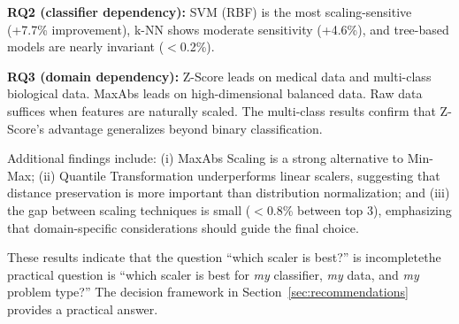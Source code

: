 \documentclass[12pt,a4paper]{article}
\begin{document}
\textbf{RQ2 (classifier dependency):} SVM (RBF) is the most scaling-sensitive (+7.7\% improvement), k-NN shows moderate sensitivity (+4.6\%), and tree-based models are nearly invariant ($<$0.2\%).

\textbf{RQ3 (domain dependency):} Z-Score leads on medical data and multi-class biological data. MaxAbs leads on high-dimensional balanced data. Raw data suffices when features are naturally scaled. The multi-class results confirm that Z-Score's advantage generalizes beyond binary classification.

Additional findings include: (i) MaxAbs Scaling is a strong alternative to Min-Max; (ii) Quantile Transformation underperforms linear scalers, suggesting that distance preservation is more important than distribution normalization; and (iii) the gap between scaling techniques is small ($<$0.8\% between top 3), emphasizing that domain-specific considerations should guide the final choice.

These results indicate that the question ``which scaler is best?'' is incomplete\textemdash the practical question is ``which scaler is best for \emph{my} classifier, \emph{my} data, and \emph{my} problem type?'' The decision framework in Section~\ref{sec:recommendations} provides a practical answer.


\label{sec:references}
\end{document}
